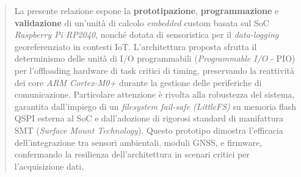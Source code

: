\begin{abstract}
\noindent La presente relazione espone la \textbf{prototipazione}, \textbf{programmazione} e \textbf{validazione} di un'unità di calcolo \textit{embedded} custom basata sul SoC \textit{Raspberry Pi RP2040}, nonché dotata di sensoristica per il \textit{data-logging} georeferenziato in contesti IoT. L'architettura proposta sfrutta il determinismo delle unità di I/O programmabili (\textit{Programmable I/O} - PIO) per l'offloading hardware di task critici di timing, preservando la reattività dei core \textit{ARM Cortex-M0+} durante la gestione delle periferiche di comunicazione. Particolare attenzione è rivolta alla robustezza del sistema, garantita dall'impiego di un \textit{filesystem fail-safe (LittleFS)} su memoria flash QSPI esterna al SoC e dall'adozione di rigorosi standard di manifattura SMT (\textit{Surface Mount Technology}). Questo prototipo dimostra l'efficacia dell'integrazione tra sensori ambientali, moduli GNSS, e firmware, confermando la resilienza dell'architettura in scenari critici per l'acquisizione dati.
\end{abstract}
